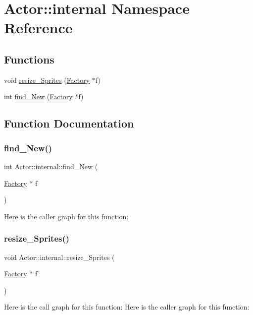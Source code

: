 \hypertarget{namespace_actor_1_1internal}{}\section{Actor\+:\+:internal Namespace Reference}
\label{namespace_actor_1_1internal}
\subsection*{Functions}
\begin{DoxyCompactItemize}
\item 
void \mbox{\hyperlink{namespace_actor_1_1internal_a5bc313afefe286a814f4e14b0898c84e}{resize\+\_\+\+Sprites}} (\mbox{\hyperlink{struct_actor_1_1_factory}{Factory}} $\ast$f)
\item 
int \mbox{\hyperlink{namespace_actor_1_1internal_ae7e5f0fbb1b3afc21c7ae2713e41db3a}{find\+\_\+\+New}} (\mbox{\hyperlink{struct_actor_1_1_factory}{Factory}} $\ast$f)
\end{DoxyCompactItemize}


\subsection{Function Documentation}
\mbox{\label{namespace_actor_1_1internal_ae7e5f0fbb1b3afc21c7ae2713e41db3a}} 
\subsubsection{\texorpdfstring{find\+\_\+\+New()}{find\_New()}}
{\footnotesize\ttfamily int Actor\+::internal\+::find\+\_\+\+New (\begin{DoxyParamCaption}\item[{\mbox{\hyperlink{struct_actor_1_1_factory}{Factory}} $\ast$}]{f }\end{DoxyParamCaption})}

Here is the caller graph for this function\+:
\mbox{\label{namespace_actor_1_1internal_a5bc313afefe286a814f4e14b0898c84e}} 
\subsubsection{\texorpdfstring{resize\+\_\+\+Sprites()}{resize\_Sprites()}}
{\footnotesize\ttfamily void Actor\+::internal\+::resize\+\_\+\+Sprites (\begin{DoxyParamCaption}\item[{\mbox{\hyperlink{struct_actor_1_1_factory}{Factory}} $\ast$}]{f }\end{DoxyParamCaption})}

Here is the call graph for this function\+:
Here is the caller graph for this function\+:
